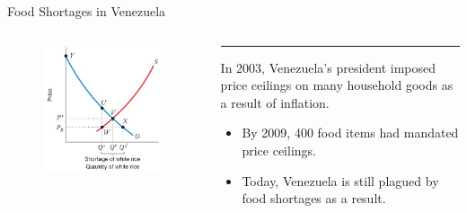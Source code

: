 \documentclass[11pt,t]{beamer}
\begin{document}
\begin{frame}{Food Shortages in Venezuela}
  \begin{columns}[T]
    \vspace{0pt}
    \begin{column}{.55\textwidth}
      \begin{figure}
        \includegraphics[width=\textwidth]{figures/fig10_8.jpg}
      \end{figure}

      \vspace*{50mm} %
    \end{column}
    
    \hfill
    
    \begin{column}{.45\textwidth}
      {\color{accent}\rule{\linewidth}{2pt}}

      In 2003, Venezuela's president imposed price ceilings on many household goods as a result of inflation.

      \begin{itemize}
        \item By 2009, 400 food items had mandated price ceilings.
        
        \item Today, Venezuela is still plagued by food shortages as a result.
      \end{itemize}
    \end{column}
  \end{columns}
\end{frame}
\end{document}
